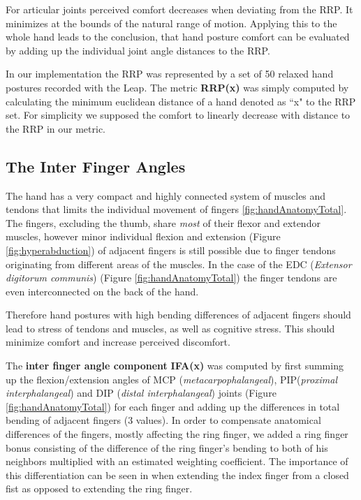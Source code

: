 \documentclass{sig-alternate-05-2015}
\begin{document}
For articular joints perceived comfort decreases when deviating from the RRP. It minimizes at the bounds of the natural range of motion. Applying this to the whole hand leads to the conclusion, that hand posture comfort can be evaluated by adding up the individual joint angle distances to the RRP. \cite{naddeo2015proposal}

In our implementation the RRP was represented by a set of 50 relaxed hand postures recorded with the Leap. The metric \textbf{RRP(x)} was simply computed by calculating the minimum euclidean distance of a hand denoted as ``x" to the RRP set.
For simplicity we supposed the comfort to linearly decrease with distance to the RRP in our metric.

\subsection{The Inter Finger Angles}

The hand has a very compact and highly connected system of muscles and tendons that limits the individual movement of fingers \ref{fig:handAnatomyTotal}.
The fingers, excluding the thumb, share \textsl{most} of their flexor and extendor muscles, however minor individual flexion and extension (Figure \ref{fig:hyperabduction}) of adjacent fingers is still possible due to finger tendons originating from different areas of the muscles. In the case of the EDC (\textit{Extensor digitorum communis}) (Figure \ref{fig:handAnatomyTotal}) the finger tendons are even interconnected on the back of the hand. 

Therefore hand postures with high bending differences of adjacent fingers should lead to stress of tendons and muscles, as well as cognitive stress. This should minimize comfort and increase perceived discomfort.

The \textbf{inter finger angle component} \textbf{IFA(x)} was computed by first summing up the flexion/extension angles of MCP (\textit{metacarpophalangeal}), PIP(\textit{proximal interphalangeal}) and DIP (\textit{distal interphalangeal}) joints (Figure \ref{fig:handAnatomyTotal}) for each finger and adding up the differences in total bending of adjacent fingers (3 values). In order to compensate anatomical differences of the fingers, mostly affecting the ring finger, we added a ring finger bonus consisting of the difference of the ring finger's bending to both of his neighbors multiplied with an estimated weighting coefficient. The importance of this differentiation can be seen in when extending the index finger from a closed fist as opposed to extending the ring finger. 
\end{document}
